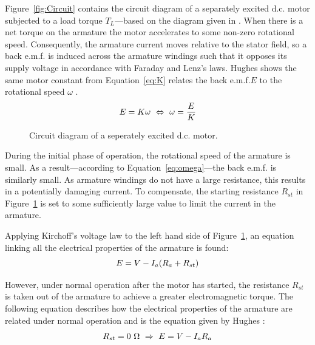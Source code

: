 \documentclass[a4paper,11pt,twocolumn]{article}
\newcommand{\Ohm}{\si{\ohm}\xspace}
\newcommand{\DC}{d.c.\xspace}
\newcommand{\EMF}{e.m.f.\xspace}
\begin{document}
Figure~\vref{fig:Circuit} contains the circuit diagram of a separately excited 
\DC motor subjected to a load torque $T_L$---based on the diagram given in 
\cite{kazemtabrizi2015dc}. When there is a net torque on the armature the motor 
accelerates to some non-zero rotational speed. Consequently, the armature 
current moves relative to the stator field, so a back \EMF is induced across 
the armature windings such that it opposes its supply voltage in accordance 
with Faraday and Lenz's laws. Hughes shows the same motor constant from 
Equation~\ref{eq:K} relates the back \EMF $E$ to the rotational speed $\omega$ 
\cite[p.~873]{hughes2010hughes}.
\begin{equation}  \label{eq:omega}
    E = K \omega ~\Leftrightarrow~ \omega = \frac{E}{K} \\
\end{equation}

\begin{figure}[h]
    \centering
    \def\svgwidth{0.48\textwidth}
    
    \caption{Circuit diagram of a seperately excited \DC motor.}
    \label{fig:Circuit}
\end{figure}

During the initial phase of operation, the rotational speed of the armature is 
small. As a result---according to Equation~\ref{eq:omega}---the back \EMF is 
similarly small. As armature windings do not have a large resistance, this 
results in a potentially damaging current. To compensate, the starting 
resistance $R_{st}$ in  Figure~\ref{fig:Circuit} is set to some sufficiently 
large value to limit the current in the armature.

Applying Kirchoff's voltage law to the left hand side of 
Figure~\ref{fig:Circuit}, an equation linking all the electrical properties of 
the armature is found:
\begin{equation}  \label{eq:ERst}
    E = V - I_a(R_a + R_{st}) \\
\end{equation}

However, under normal operation after the motor has started, the resistance 
$R_{st}$ is taken out of the armature to achieve a greater electromagnetic 
torque. The following equation describes how the electrical properties of the 
armature are related under normal operation and is the equation given by Hughes 
\cite[p.~871]{hughes2010hughes}:
\begin{equation}  \label{eq:E}
    R_{st} = 0~\Ohm ~\Rightarrow~ E = V - I_a R_a \\
\end{equation}
\end{document}
